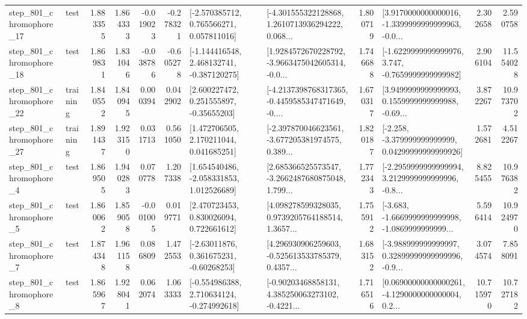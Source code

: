 \begin{tabular}{llrrrrllrlrr}
  step\_801\_chromophore\_17 &      test &      1.883355 &    1.864333 &     -0.019023 & -0.278321 &    [-2.570385712, 0.765566271, 0.057811016] &  [-4.301555322128868, 1.2610713936294222, 0.068... &       1.800719 &  [3.9170000000000016, -1.3399999999999963, -0.0... &            2.302658 &          2.590758 \\
  step\_801\_chromophore\_18 &      test &      1.869831 &    1.831046 &     -0.038786 & -0.605278 &   [-1.144416548, 2.468132741, -0.387120275] &  [1.9284572670228792, -3.9663475042605314, -0.0... &       1.746688 &  [-1.6229999999999976, 3.747, -0.7659999999999982] &            2.906104 &         11.554028 \\
  step\_801\_chromophore\_22 &  training &      1.840552 &    1.840945 &      0.000394 &  0.042902 &     [2.600227472, 0.251555897, -0.35655203] &  [-4.2137398768317365, -0.4459585347471649, -0.... &       1.670317 &  [3.9499999999999993, 0.1559999999999988, -0.69... &            3.872267 &         10.973702 \\
  step\_801\_chromophore\_27 &  training &      1.891437 &    1.923150 &      0.031713 &  0.561050 &     [1.472706505, 2.170211044, 0.041685251] &  [-2.397870046623561, -3.677205381974575, 0.389... &       1.820187 &  [-2.258, -3.379999999999999, 0.04299999999999926] &            1.572681 &          4.512267 \\
   step\_801\_chromophore\_4 &      test &      1.869505 &    1.940283 &      0.070778 &  1.207338 &    [1.654540486, -2.058331853, 1.012526689] &  [2.685366525573547, -3.2662487680875048, 1.799... &       1.772343 &  [-2.2959999999999994, 3.2129999999999996, -0.8... &            8.825455 &         10.976382 \\
   step\_801\_chromophore\_5 &      test &      1.860062 &    1.859058 &     -0.001005 &  0.019771 &     [2.470723453, 0.830026094, 0.722661612] &  [4.098278599328035, 0.9739205764188514, 1.3657... &       1.755912 &  [-3.683, -1.6669999999999998, -1.0869999999999... &            5.596414 &         10.924970 \\
   step\_801\_chromophore\_7 &      test &      1.874348 &    1.961158 &      0.086809 &  1.472553 &     [-2.63011876, 0.361675231, -0.60268253] &  [4.296930906259603, -0.525613533785379, 0.4357... &       1.683152 &  [-3.988999999999997, 0.32899999999999996, -0.9... &            3.074574 &          7.858091 \\
   step\_801\_chromophore\_8 &      test &      1.865967 &    1.928041 &      0.062074 &  1.063333 &   [-0.554986388, 2.710634124, -0.274992618] &  [-0.90203468858131, 4.385250063273102, -0.4221... &       1.716516 &  [0.06900000000000261, -4.1290000000000004, 0.2... &           10.715970 &         10.727182 \\

\end{tabular}
